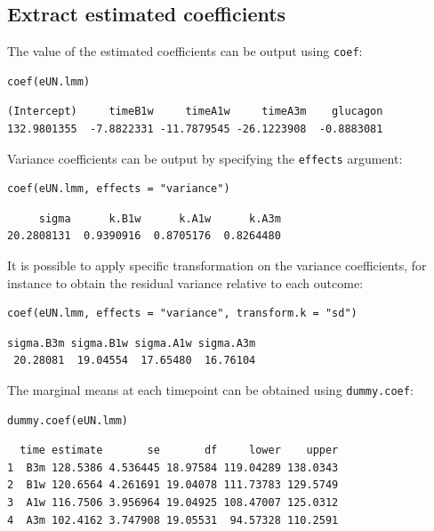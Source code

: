 \documentclass[12pt]{article}
\begin{document}
\subsection{Extract estimated coefficients}
\label{sec:org353d019}
The value of the estimated coefficients can be output using \texttt{coef}:
\lstset{language=r,label= ,caption= ,captionpos=b,numbers=none}
\begin{lstlisting}
coef(eUN.lmm)
\end{lstlisting}

\begin{verbatim}
(Intercept)     timeB1w     timeA1w     timeA3m    glucagon 
132.9801355  -7.8822331 -11.7879545 -26.1223908  -0.8883081
\end{verbatim}


Variance coefficients can be output by specifying the \texttt{effects} argument:
\lstset{language=r,label= ,caption= ,captionpos=b,numbers=none}
\begin{lstlisting}
coef(eUN.lmm, effects = "variance")
\end{lstlisting}

\begin{verbatim}
     sigma      k.B1w      k.A1w      k.A3m 
20.2808131  0.9390916  0.8705176  0.8264480
\end{verbatim}



It is possible to apply specific transformation on the variance
coefficients, for instance to obtain the residual variance relative to
each outcome:
\lstset{language=r,label= ,caption= ,captionpos=b,numbers=none}
\begin{lstlisting}
coef(eUN.lmm, effects = "variance", transform.k = "sd")
\end{lstlisting}

\begin{verbatim}
sigma.B3m sigma.B1w sigma.A1w sigma.A3m 
 20.28081  19.04554  17.65480  16.76104
\end{verbatim}


The marginal means at each timepoint can be obtained using \texttt{dummy.coef}:
\lstset{language=r,label= ,caption= ,captionpos=b,numbers=none}
\begin{lstlisting}
dummy.coef(eUN.lmm)
\end{lstlisting}

\begin{verbatim}
  time estimate       se       df     lower    upper
1  B3m 128.5386 4.536445 18.97584 119.04289 138.0343
2  B1w 120.6564 4.261691 19.04078 111.73783 129.5749
3  A1w 116.7506 3.956964 19.04925 108.47007 125.0312
4  A3m 102.4162 3.747908 19.05531  94.57328 110.2591
\end{verbatim}
\end{document}
